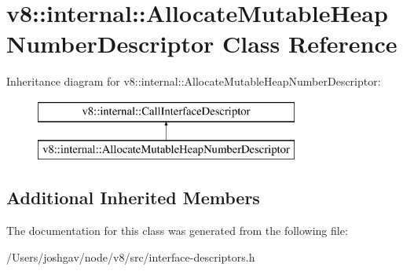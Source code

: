 \hypertarget{classv8_1_1internal_1_1_allocate_mutable_heap_number_descriptor}{}\section{v8\+:\+:internal\+:\+:Allocate\+Mutable\+Heap\+Number\+Descriptor Class Reference}
\label{classv8_1_1internal_1_1_allocate_mutable_heap_number_descriptor}
Inheritance diagram for v8\+:\+:internal\+:\+:Allocate\+Mutable\+Heap\+Number\+Descriptor\+:\begin{figure}[H]
\begin{center}
\leavevmode
\includegraphics[height=2.000000cm]{classv8_1_1internal_1_1_allocate_mutable_heap_number_descriptor}
\end{center}
\end{figure}
\subsection*{Additional Inherited Members}


The documentation for this class was generated from the following file\+:\begin{DoxyCompactItemize}
\item 
/\+Users/joshgav/node/v8/src/interface-\/descriptors.\+h\end{DoxyCompactItemize}
